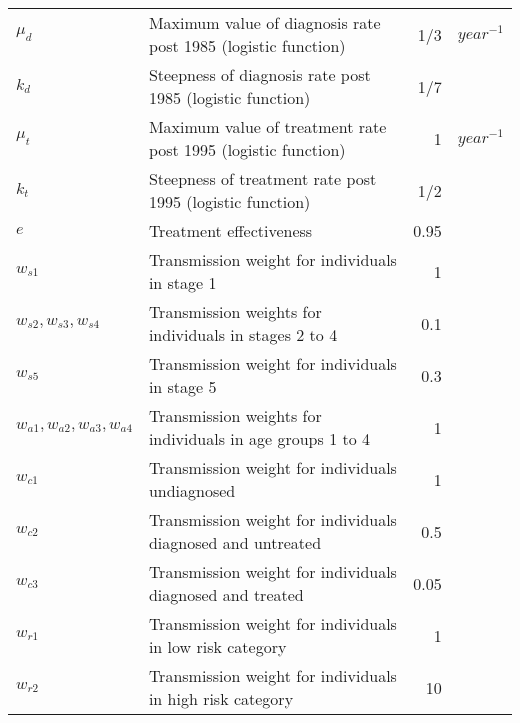 \begin{tabular}{llrl}
$	\mu_d	$	&	Maximum value of diagnosis rate post 1985 (logistic function)	&	1/3	&	$year^{-1}$	\\
$	k_d	$	&	Steepness of diagnosis rate post 1985 (logistic function)	&	1/7	&		\\
$	\mu_t	$	&	Maximum value of treatment rate post 1995 (logistic function)	&	1	&	$year^{-1}$	\\
$	k_t	$	&	Steepness of treatment rate post 1995 (logistic function)	&	1/2	&		\\
$	e	$	&	Treatment effectiveness	&	0.95	&		\\
$	w_{s1}	$	&	Transmission weight for individuals in stage 1	&	1	&		\\
$	w_{s2}, w_{s3}, w_{s4}	$	&	Transmission weights for individuals in stages 2 to 4	&	0.1	&		\\
$	w_{s5}	$	&	Transmission weight for individuals in stage 5	&	0.3	&		\\
$	w_{a1}, w_{a2}, w_{a3}, w_{a4}	$	&	Transmission weights for individuals in age groups 1 to 4	&	1	&		\\
$	w_{c1}	$	&	Transmission weight for individuals undiagnosed	&	1	&		\\
$	w_{c2}	$	&	Transmission weight for individuals diagnosed and untreated	&	0.5	&		\\
$	w_{c3}	$	&	Transmission weight for individuals diagnosed and treated	&	0.05	&		\\
$	w_{r1}	$	&	Transmission weight for individuals in low risk category	&	1	&		\\
$	w_{r2}	$	&	Transmission weight for individuals in high risk category	&	10	&		\\
									
	\hline  %
\end{tabular} 
